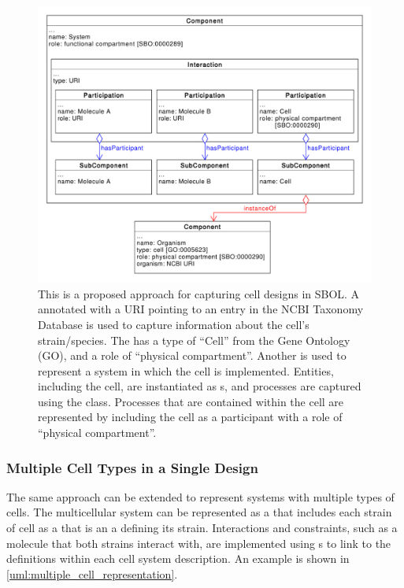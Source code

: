 \begin{figure}[htp]
	\begin{center}
		\includegraphics[width=\textwidth]{uml/cell_representation}
		\caption[Repressenting a cell]{This is a proposed approach for capturing cell designs in SBOL. A  annotated with a URI pointing to an entry in the NCBI Taxonomy Database is used to capture information about the cell's strain/species. 
		The  has a type of ``Cell'' from the Gene Ontology (GO), and a role of ``physical compartment''. 
		Another  is used to represent a system in which the cell is implemented. 
		Entities, including the cell, are instantiated as s, and processes are captured using the  class.
		Processes that are contained within the cell are represented by including the cell as a participant with a role of ``physical compartment''. }
		\label{uml:cell_representation}
	\end{center}
\end{figure}

\subsubsection{Multiple Cell Types in a Single Design}

The same approach can be extended to represent systems with multiple types of cells.
The multicellular system can be represented as a  that includes each strain of cell as a  that is an  a  defining its strain.
Interactions and constraints, such as a molecule that both strains interact with, are implemented using s to link to the definitions within each cell system description.
An example is shown in \ref{uml:multiple_cell_representation}.

